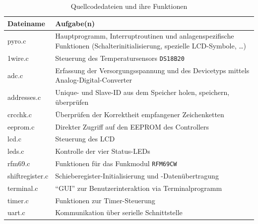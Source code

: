 \documentclass[paper=a4, parskip, numbers=noenddot, toc=listof, headsepline]{scrbook}
\begin{document}
		 \begin{table}[h]
			 \centering
			 \begin{tabular}{lp{125mm}}
				 \hline\hline \textbf{Dateiname} & \textbf{Aufgabe(n)}                                                                                                        \\ \hline
				 pyro.c                          & Hauptprogramm, Interruptroutinen und anlagenspezifische Funktionen (Schalterinitialisierung, spezielle LCD-Symbole, \dots) \\
				 1wire.c                         & Steuerung des Temperatursensors \texttt{DS18B20}                                                                           \\
				 adc.c                           & Erfassung der Versorgungsspannung und des Devicetyps mittels Analog-Digital-Converter                                      \\
				 addresses.c                     & Unique- und Slave-ID aus dem Speicher holen, speichern, überprüfen                                                         \\
				 crcchk.c                        & Überprüfen der Korrektheit empfangener Zeichenketten                                                                       \\
				 eeprom.c                        & Direkter Zugriff auf den EEPROM des Controllers                                                                            \\
				 lcd.c                           & Steuerung des LCD                                                                                                          \\
				 leds.c                          & Kontrolle der vier Status-LEDs                                                                                             \\
				 rfm69.c                         & Funktionen für das Funkmodul \texttt{RFM69CW}                                                                              \\
				 shiftregister.c                 & Schieberegister-Initialisierung und -Datenübertragung                                                                      \\
				 terminal.c                      & \enquote{GUI} zur Benutzerinteraktion via Terminalprogramm                                                                 \\
				 timer.c                         & Funktionen zur Timer-Steuerung                                                                                             \\
				 uart.c                          & Kommunikation über serielle Schnittstelle                                                                                  \\ \hline\hline
			 \end{tabular}
			 \caption{Quellcodedateien und ihre Funktionen}
			 \label{tab:sourcefiles}
		 \end{table}
\end{document}
